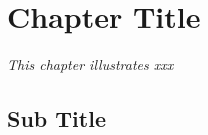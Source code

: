 \chapter{Chapter Title}
\label{chap5}
\textit{This chapter illustrates xxx}
\vspace{2ex}\vfill
\minitoc
\newpage

\section{Sub Title}
